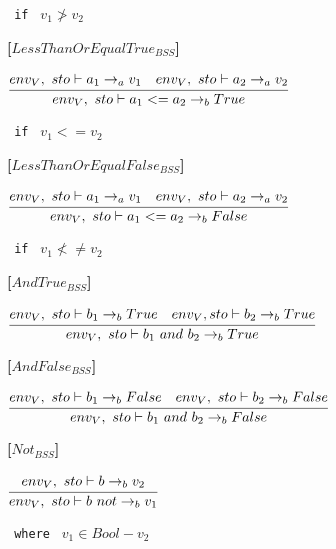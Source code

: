 {\begin{center}
	\texttt{ if } $v_1 \not> v_2$
\end{center}

\textbf{[$LessThanOrEqualTrue_{BSS}$]}\\
\begin{center}
	\begin{math}
	\cfrac
	{env_V,\ sto \vdash a_1 \rightarrow_a v_1 \quad env_V,\ sto \vdash a_2 \rightarrow_a v_2}
	{env_V,\ sto \vdash a_1 <= a_2 \rightarrow_b True}
	\end{math}
	
	\texttt{ if } $v_1 <= v_2$
\end{center}

\textbf{[$LessThanOrEqualFalse_{BSS}$]}\\
\begin{center}
	\begin{math}
	\cfrac
	{env_V,\ sto \vdash a_1 \rightarrow_a v_1 \quad env_V,\ sto \vdash a_2 \rightarrow_a v_2}
	{env_V,\ sto \vdash a_1 <= a_2 \rightarrow_b False}
	\end{math}
	
	\texttt{ if } $v_1 \not<\not= v_2$
\end{center}

\textbf{[$AndTrue_{BSS}$]}\\
\begin{center}
	\begin{math}
	\cfrac
		{env_V,\ sto \vdash b_1 \rightarrow_b True \quad env_V, sto \vdash b_2 \rightarrow_b True}
		{env_V,\ sto \vdash b_1\ and\ b_2 \rightarrow_b True}
	\end{math}
\end{center}

\textbf{[$AndFalse_{BSS}$]}\\
\begin{center}
	\begin{math}
	\cfrac
		{env_V,\ sto \vdash b_1 \rightarrow_b False \quad env_V,\ sto \vdash b_2 \rightarrow_b False}
		{env_V,\ sto \vdash b_1\ and\ b_2 \rightarrow_b False}
	\end{math}
\end{center}

\textbf{[$Not_{BSS}$]}\\
\begin{center}
	\begin{math}
	\cfrac
	{env_V,\ sto \vdash b \rightarrow_b v_2}
	{env_V,\ sto \vdash b\ not \rightarrow_b v_1}
	\end{math}
	
	\texttt{ where } $v_1 \in Bool - v_2$
\end{center}

}
